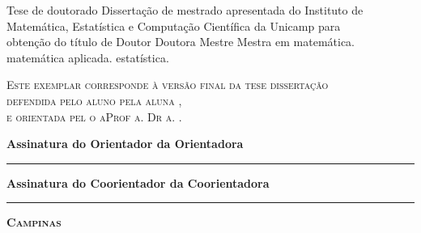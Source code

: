 \vspace{.5cm}
\begin{flushright}
    \begin{minipage}[c]{.8\textwidth}
        \begin{flushright}
            \ifx\mestrado\undefined
            Tese de doutorado
            \else
            Dissertação de mestrado
            \fi
            apresentada do Instituto de \\ Matemática,
            Estatística e Computação Científica
            da Unicamp para \\ obtenção do título de
            \ifx\mestrado\undefined
                \ifx\femaleAuthor\undefined
                Doutor
                \else
                Doutora
                \fi
            \else
                \ifx\femaleAuthor\undefined
                Mestre
                \else
                Mestra
                \fi
            \fi
            em
            \ifx\matematica\undefined
            \else
            matemática.
            \fi
            \ifx\aplicada\undefined
            \else
            matemática aplicada.
            \fi
            \ifx\estatistica\undefined
            \else
            estatística.
            \fi
        \end{flushright}
    \end{minipage}
\end{flushright}
\vspace{.5cm}
\noindent
{\footnotesize \scshape
Este exemplar corresponde à versão final da 
\ifx\mestrado\undefined
tese
\else
dissertação
\fi \\
defendida 
\ifx\femaleAuthor\undefined
pelo aluno
\else
pela aluna
\fi
\autor,\\
e orientada pel\ifx\femaleOrientador\undefined
o\else
a\fi Prof\ifx\femaleOrientador\undefined
\else
a\fi. Dr\ifx\femaleOrientador\undefined
\else
a\fi. \orientador.
}
\vspace{1cm}

\noindent
{\small \bfseries
\noindent
Assinatura
\ifx\femaleOrientador\undefined
do Orientador
\else
da Orientadora
\fi

\vspace{.7cm}
\noindent
\rule[1pt]{7cm}{.5pt}  %
}
\vspace{.5cm}


\ifx\coorientador\undefined
\else
{\small \bfseries
\noindent
Assinatura
\ifx\femaleCoorientador\undefined
do Coorientador
\else
da Coorientadora
\fi

\vspace{.7cm}
\noindent
\rule[1pt]{7cm}{.5pt}  %
}
\fi
\vfill
\begin{center}
    {\small \scshape \bfseries Campinas \\ \ano}
\end{center}
